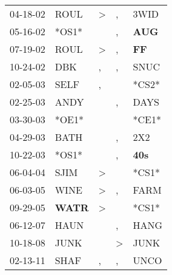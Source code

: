 \begin{supertabular}{p{0.07\textwidth}p{0.06\textwidth}p{0.02\textwidth}p{0.02\textwidth}p{0.06\textwidth}}
 04-18-02\textsuperscript{} &           ROUL\textsuperscript{} &     \textgreater &             , &          3WID\textsuperscript{} \\
 05-16-02\textsuperscript{} &                            *OS1* &                  &             , &  \textbf{AUG\textsuperscript{}} \\
 07-19-02\textsuperscript{} &           ROUL\textsuperscript{} &     \textgreater &             , &   \textbf{FF\textsuperscript{}} \\
 10-24-02\textsuperscript{} &            DBK\textsuperscript{} &                , &             , &          SNUC\textsuperscript{} \\
 02-05-03\textsuperscript{} &           SELF\textsuperscript{} &                , &               &                           *CS2* \\
 02-25-03\textsuperscript{} &           ANDY\textsuperscript{} &                  &             , &          DAYS\textsuperscript{} \\
 03-30-03\textsuperscript{} &                            *OE1* &                  &               &                           *CE1* \\
 04-29-03\textsuperscript{} &           BATH\textsuperscript{} &                  &             , &           2X2\textsuperscript{} \\
 10-22-03\textsuperscript{} &                            *OS1* &                  &             , &  \textbf{40s\textsuperscript{}} \\
 06-04-04\textsuperscript{} &           SJIM\textsuperscript{} &     \textgreater &               &                           *CS1* \\
 06-03-05\textsuperscript{} &           WINE\textsuperscript{} &     \textgreater &             , &          FARM\textsuperscript{} \\
 09-29-05\textsuperscript{} &  \textbf{WATR\textsuperscript{}} &     \textgreater &               &                           *CS1* \\
 06-12-07\textsuperscript{} &           HAUN\textsuperscript{} &                  &             , &          HANG\textsuperscript{} \\
 10-18-08\textsuperscript{} &           JUNK\textsuperscript{} &                  &  \textgreater &          JUNK\textsuperscript{} \\
 02-13-11\textsuperscript{} &           SHAF\textsuperscript{} &                , &             , &          UNCO\textsuperscript{} \\

\end{supertabular}
